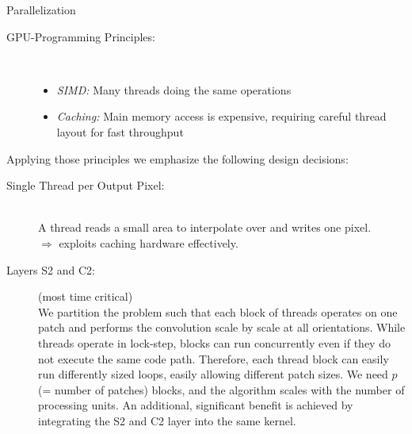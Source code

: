 \documentclass[final]{beamer}
\begin{document}
\begin{frame}{}
\begin{columns}[t]
\begin{column}{.48\linewidth}
        \begin{block}{Parallelization}
\begin{description}
\item[GPU-Programming Principles:]~
	\begin{itemize}
		\item \emph{SIMD:} Many threads doing the same operations
		\item \emph{Caching:} Main memory access is expensive, requiring careful thread layout for fast throughput
	\end{itemize}
\end{description}
Applying those principles we emphasize the following design decisions:
\begin{description}
\item[Single Thread per Output Pixel:]~\\
A thread reads a small area to interpolate over and writes one pixel.\\
$\Rightarrow$ exploits caching hardware effectively.

\item[Layers S2 and C2:] (most time critical)\\
We partition the problem such that each block of threads operates on one patch and performs the convolution scale by scale at all orientations. \nesline
While threads operate in lock-step, blocks can run concurrently even if they do not execute the same code path. Therefore, each thread block can easily run differently sized loops, easily allowing different patch sizes. We need $p$ (= number of patches) blocks, and the algorithm scales
with the number of processing units. \newline
An additional, significant benefit is achieved by integrating the S2
and C2 layer into the same kernel.

\end{description}

        \end{block}        
        
      \end{column}
      
      

\end{columns}
\end{frame}
\end{document}
